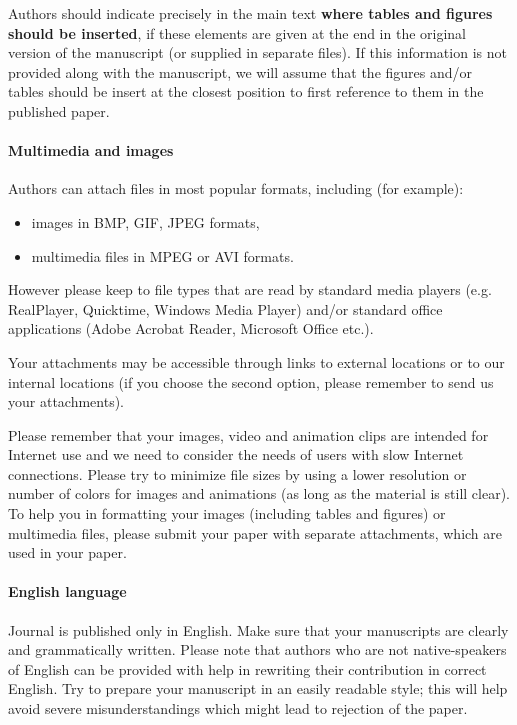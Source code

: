 \documentclass[USenglish,oneside,twocolumn]{article}
\begin{document}
    Authors should indicate precisely in the main text {\bf where tables and figures should be inserted}, if these elements are given at the end in the original version of the manuscript (or supplied in separate files).
    If this information is not provided along with the manuscript, we will assume that the figures and/or tables should be insert at the closest position to first reference to them in the published paper.

\paragraph{Multimedia and images}
    Authors can attach files in most popular formats, including (for example):
\begin{itemize}
\item images in BMP, GIF, JPEG formats,
\item multimedia files in MPEG or AVI formats.
\end{itemize}

However please keep to file types that are read by standard media players (e.g. RealPlayer, Quicktime, Windows Media Player) and/or standard office applications (Adobe Acrobat Reader, Microsoft Office etc.).

    Your attachments may be accessible through links to external locations or to our internal locations (if you choose the second option, please remember to send us your attachments).

    Please remember that your images, video and animation clips are intended for Internet use and we need to consider the needs of users with slow Internet connections. Please try to minimize file sizes by using a lower resolution or number of colors for images and animations (as long as the material is still clear). To help you in formatting your images (including tables and figures) or multimedia files, please submit your paper with separate attachments, which are used in your paper.

\paragraph{English language}
 Journal     is published only in English. Make sure that your manuscripts are clearly and grammatically written. Please note that authors who are not native-speakers of English can be provided with help in rewriting their contribution in correct English. Try to prepare your manuscript in an easily readable style; this will help avoid severe misunderstandings which might lead to rejection of the paper.
\end{document}
